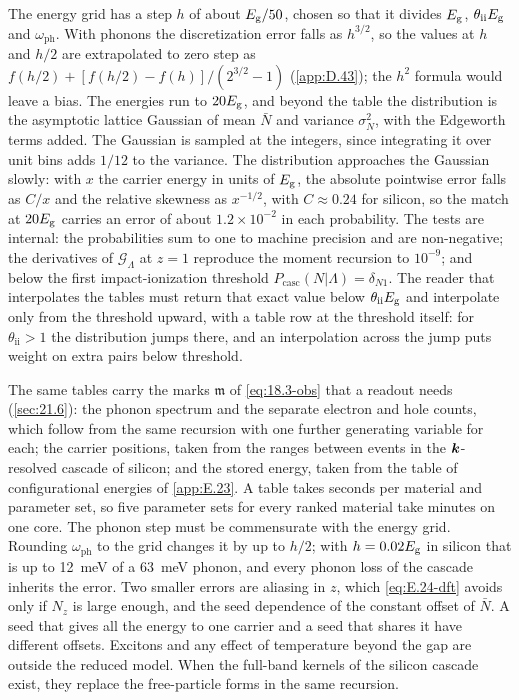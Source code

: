 The energy grid has a step $h$ of about $E_{\mathrm{g}}/50$, chosen so that it divides $E_{\mathrm{g}}$, $\theta_{\mathrm{ii}}E_{\mathrm{g}}$ and $\omega_{\mathrm{ph}}$. With phonons the discretization error falls as $h^{3/2}$, so the values at $h$ and $h/2$ are extrapolated to zero step as $f(h/2) + [f(h/2) - f(h)]/(2^{3/2} - 1)$ (\cref{app:D.43}); the $h^2$ formula would leave a bias. The energies run to $20E_{\mathrm{g}}$, and beyond the table the distribution is the asymptotic lattice Gaussian of mean $\bar N$ and variance $\sigma_N^2$, with the Edgeworth terms added. The Gaussian is sampled at the integers, since integrating it over unit bins adds $1/12$ to the variance. The distribution approaches the Gaussian slowly: with $x$ the carrier energy in units of $E_{\mathrm{g}}$, the absolute pointwise error falls as $C/x$ and the relative skewness as $x^{-1/2}$, with $C \approx 0.24$ for silicon, so the match at $20E_{\mathrm{g}}$ carries an error of about $1.2\times10^{-2}$ in each probability. The tests are internal: the probabilities sum to one to machine precision and are non-negative; the derivatives of $\mathcal{G}_\Lambda$ at $z = 1$ reproduce the moment recursion to $10^{-9}$; and below the first impact-ionization threshold $P_{\mathrm{casc}}(N|\Lambda) = \delta_{N1}$. The reader that interpolates the tables must return that exact value below $\theta_{\mathrm{ii}}E_{\mathrm{g}}$ and interpolate only from the threshold upward, with a table row at the threshold itself: for $\theta_{\mathrm{ii}} > 1$ the distribution jumps there, and an interpolation across the jump puts weight on extra pairs below threshold.

The same tables carry the marks $\mathfrak{m}$ of \cref{eq:18.3-obs} that a readout needs (\cref{sec:21.6}): the phonon spectrum and the separate electron and hole counts, which follow from the same recursion with one further generating variable for each; the carrier positions, taken from the ranges between events in the $\bm{k}$-resolved cascade of silicon; and the stored energy, taken from the table of configurational energies of \cref{app:E.23}. A table takes seconds per material and parameter set, so five parameter sets for every ranked material take minutes on one core. The phonon step must be commensurate with the energy grid. Rounding $\omega_{\mathrm{ph}}$ to the grid changes it by up to $h/2$; with $h = 0.02E_{\mathrm{g}}$ in silicon that is up to \SI{12}{meV} of a \SI{63}{meV} phonon, and every phonon loss of the cascade inherits the error. Two smaller errors are aliasing in $z$, which \cref{eq:E.24-dft} avoids only if $N_z$ is large enough, and the seed dependence of the constant offset of $\bar N$. A seed that gives all the energy to one carrier and a seed that shares it have different offsets. Excitons and any effect of temperature beyond the gap are outside the reduced model. When the full-band kernels of the silicon cascade exist, they replace the free-particle forms in the same recursion.


